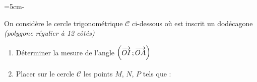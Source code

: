 \documentclass{book}
\begin{document}
\begin{multicols*}{2}
\leavevmode\exercice


=5cm\hsize\advance{}-
\begin{minipage}[t]{\dimen1}
On consid\`ere le cercle trigonom\'etrique $\mathscr{C}$ ci-dessous o\`u est inscrit un dod\'ecagone {\it(polygone r\'egulier \`a 12 c\^ot\'es)}
\vskip0.2cm
\begin{enumerate}
\item D\'eterminer la mesure de l'angle $\coord{\Vec{OI}}{\Vec{OA}}$

\item Placer sur le cercle $\mathscr{C}$ les points $M$, $N$, $P$ tels que :
\end{enumerate}
\end{minipage}
\begin{minipage}[t]{\dimen0}
\leavevmode\hfill{}\hbox{}
\end{minipage}



\end{multicols*}
\end{document}
